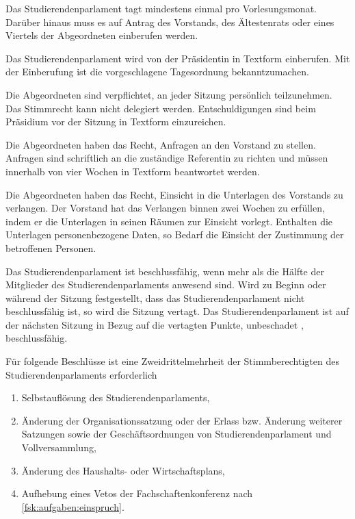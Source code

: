 Das Studierendenparlament tagt mindestens einmal pro Vorlesungsmonat. Darüber hinaus muss es auf Antrag des Vorstands, des Ältestenrats oder eines Viertels der Abgeordneten einberufen werden.

Das Studierendenparlament wird von der Präsidentin in Textform einberufen. Mit der Einberufung ist die vorgeschlagene Tagesordnung bekanntzumachen.

Die Abgeordneten sind verpflichtet, an jeder Sitzung persönlich teilzunehmen. Das Stimmrecht kann nicht delegiert werden. Entschuldigungen sind beim Präsidium vor der Sitzung in Textform einzureichen.

Die Abgeordneten haben das Recht, Anfragen an den Vorstand zu stellen. Anfragen sind schriftlich an die zuständige Referentin zu richten und müssen innerhalb von vier Wochen in Textform beantwortet werden.

Die Abgeordneten haben das Recht, Einsicht in die Unterlagen des Vorstands zu verlangen. Der Vorstand hat das Verlangen binnen zwei Wochen zu erfüllen, indem er die Unterlagen in seinen Räumen zur Einsicht vorlegt. Enthalten die Unterlagen personenbezogene Daten, so Bedarf die Einsicht der Zustimmung der betroffenen Personen.


\label{stupa:beschluesse}

Das Studierendenparlament ist beschlussfähig, wenn mehr als die Hälfte der Mitglieder des Studierendenparlaments anwesend sind. Wird zu Beginn oder während der Sitzung festgestellt, dass das Studierendenparlament nicht beschlussfähig ist, so wird die Sitzung vertagt. Das Studierendenparlament ist auf der nächsten Sitzung in Bezug auf die vertagten Punkte, unbeschadet , beschlussfähig.

  Für folgende Beschlüsse ist eine Zweidrittelmehrheit der Stimmberechtigten des Studierendenparlaments erforderlich \label{stupa:beschluesse:zweidrittel} 
  \begin{enumerate}
  \item Selbstauflösung des Studierendenparlaments,
  \item Änderung der Organisationssatzung oder der Erlass bzw. Änderung weiterer Satzungen sowie der Ge\-schäfts\-ord\-nungen von Studierendenparlament und Vollversammlung,
  \item Änderung des Haushalts- oder Wirtschaftsplans,
  \item Aufhebung eines Vetos der Fachschaftenkonferenz nach \ref{fsk:aufgaben:einspruch}.
  \end{enumerate}


